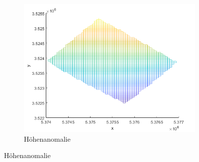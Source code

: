 \begin{figure}[ht]\centering
	\begin{subfigure}{.8\textwidth}
		\centering
		\includegraphics[width=.7\linewidth]{Images/Hoeheanomalie}  
		\caption{Höhenanomalie}
		\label{fig:sub-first}
	\end{subfigure}
\end{figure}
\newpage
